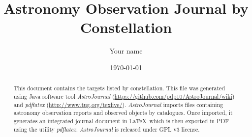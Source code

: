 \documentclass[10pt,twoside,a4paper,english]{article}
\title{Astronomy Observation Journal by Constellation}
\author{Your name}
\date{\today}
\begin{document}
\maketitle
\thispagestyle{empty}

\begin{abstract}
This document contains the targets listed by constellation. This file was generated using Java software tool {\it AstroJournal} (\href{https://github.com/pdp10/AstroJournal/wiki}{https://github.com/pdp10/AstroJournal/wiki}) and {\it pdflatex} (\href{http://www.tug.org/texlive/}{http://www.tug.org/texlive/}). {\it AstroJournal} imports files containing astronomy observation reports and observed objects by catalogues. Once imported, it generates an integrated journal document in \LaTeX\ which is then exported in PDF using the utility {\it pdflatex}. {\it AstroJournal} is released under GPL v3 license.
\end{abstract}


\tableofcontents

\clearpage
{}


\small
%
\clearpage


\small
\end{document}
